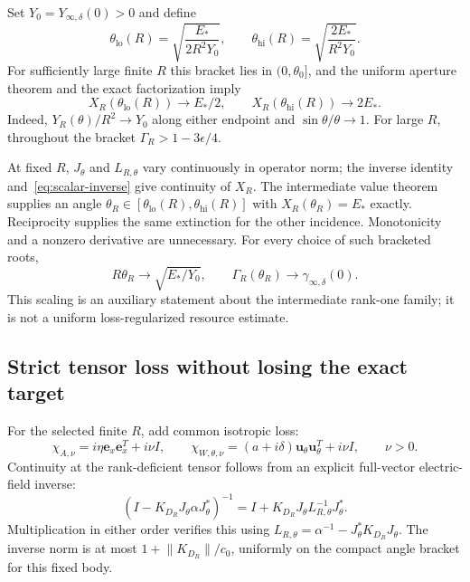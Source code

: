 \documentclass[11pt]{article}
\newcommand{\ex}{\mathbf e_x}
\newcommand{\uvec}{\mathbf u_\theta}
\newcommand{\norm}[1]{\lVert #1\rVert}
\begin{document}
Set $Y_0=Y_{\infty,\delta}(0)>0$ and define
\begin{equation}\label{eq:angle-bracket}
 \theta_{\mathrm{lo}}(R)=\sqrt{\frac{E_*}{2R^2Y_0}},\qquad
 \theta_{\mathrm{hi}}(R)=\sqrt{\frac{2E_*}{R^2Y_0}}.
\end{equation}
For sufficiently large finite $R$ this bracket lies in $(0,\theta_0]$, and the uniform aperture theorem and the exact factorization imply
\begin{equation}\label{eq:endpoints}
 X_R(\theta_{\mathrm{lo}}(R))\to E_*/2,\qquad
 X_R(\theta_{\mathrm{hi}}(R))\to2E_*.
\end{equation}
Indeed, $Y_R(\theta)/R^2\to Y_0$ along either endpoint and $\sin\theta/\theta\to1$. For large $R$, throughout the bracket $\Gamma_R>1-3\epsilon/4$.

At fixed $R$, $J_\theta$ and $L_{R,\theta}$ vary continuously in operator norm; the inverse identity and~\eqref{eq:scalar-inverse} give continuity of $X_R$. The intermediate value theorem supplies an angle $\theta_R\in[\theta_{\mathrm{lo}}(R),\theta_{\mathrm{hi}}(R)]$ with $X_R(\theta_R)=E_*$ exactly. Reciprocity supplies the same extinction for the other incidence. Monotonicity and a nonzero derivative are unnecessary. For every choice of such bracketed roots,
\begin{equation}\label{eq:root-scaling}
 R\theta_R\to\sqrt{E_*/Y_0},\qquad
 \Gamma_R(\theta_R)\to\gamma_{\infty,\delta}(0).
\end{equation}
This scaling is an auxiliary statement about the intermediate rank-one family; it is not a uniform loss-regularized resource estimate.

\subsection{Strict tensor loss without losing the exact target}
For the selected finite $R$, add common isotropic loss:
\begin{equation}\label{eq:positive-loss}
 \chi_{A,\nu}=i\eta\ex\ex^T+i\nu I,\qquad
 \chi_{W,\theta,\nu}=(a+i\delta)\uvec\uvec^T+i\nu I,
 \qquad\nu>0.
\end{equation}
Continuity at the rank-deficient tensor follows from an explicit full-vector electric-field inverse:
\begin{equation}\label{eq:electric-inverse}
 (I-K_{D_R}J_\theta\alpha J_\theta^*)^{-1}
 =I+K_{D_R}J_\theta L_{R,\theta}^{-1}J_\theta^*.
\end{equation}
Multiplication in either order verifies this using $L_{R,\theta}=\alpha^{-1}-J_\theta^*K_{D_R}J_\theta$. The inverse norm is at most $1+\norm{K_{D_R}}/c_0$, uniformly on the compact angle bracket for this fixed body.
\end{document}
